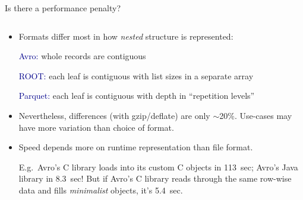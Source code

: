 \documentclass{beamer}
\begin{document}
\begin{frame}{Is there a performance penalty?}
\vspace{0.35 cm}
\begin{columns}
\begin{column}{0.55\linewidth}
\begin{itemize}
\item<1-> Formats differ most in how {\it nested} structure is represented:
\small

\vspace{0.1 cm}
\textcolor{darkblue}{Avro:} whole records are contiguous

\textcolor{darkblue}{ROOT:} each leaf is contiguous with list sizes in a separate array

\textcolor{darkblue}{Parquet:} each leaf is contiguous with depth in ``repetition levels''

\normalsize
\item<2-> Nevertheless, differences (with gzip/deflate) are only $\sim$20\%. Use-cases may have more variation than choice of format.

\item<3-> Speed depends more on runtime representation than file format.

\scriptsize
\vspace{0.1 cm}
E.g.\ Avro's C library loads into its custom C objects in 113~sec; Avro's Java library in 8.3~sec! But if Avro's C library reads through the same row-wise data and fills {\it minimalist} objects, it's 5.4~sec.


\end{itemize}
\end{column}
\end{columns}
\end{frame}
\end{document}
